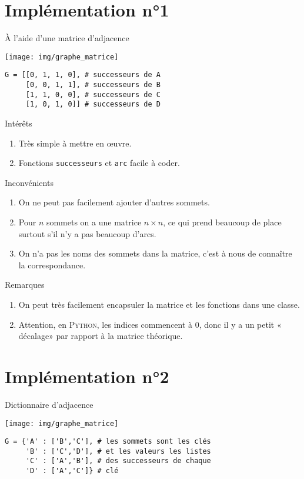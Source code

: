 \documentclass[10pt]{beamer}
\begin{document}
\section*{Implémentation n°1}
\begin{frame}[fragile]{À l'aide d'une matrice d'adjacence}
\begin{center}
\texttt{[image: img/graphe\_matrice]}
\end{center}
\begin{verbatim}
G = [[0, 1, 1, 0], # successeurs de A
     [0, 0, 1, 1], # successeurs de B
     [1, 1, 0, 0], # successeurs de C
     [1, 0, 1, 0]] # successeurs de D
\end{verbatim}
\end{frame}
\begin{frame}{Intérêts}
\begin{enumerate}[--]
	\item 	Très simple à mettre en \oe uvre.
	\item 	Fonctions \texttt{successeurs} et \texttt{arc} facile à coder.
\end{enumerate}
\end{frame}
\begin{frame}{Inconvénients}
\begin{enumerate}[--]
	\item 	On ne peut pas facilement ajouter d'autres sommets.
	\item 	Pour $n$ sommets on a une matrice $n\times n$, ce qui prend beaucoup de place surtout s'il n'y a pas beaucoup d'arcs.
    \item 	On n'a pas les noms des sommets dans la matrice, c'est à nous de connaître la correspondance.
\end{enumerate}
\end{frame}
\begin{frame}{Remarques}
\begin{enumerate}[--]
	\item 	On peut très facilement encapsuler la matrice et les fonctions dans une classe.
	\item 	Attention, en \textsc{Python}, les indices commencent à 0, donc il y a un petit « décalage» par rapport à la matrice théorique.	
\end{enumerate}

\end{frame}
\section*{Implémentation n°2}
\begin{frame}[fragile]{Dictionnaire d'adjacence}
\begin{center}
	\texttt{[image: img/graphe\_matrice]}
\end{center}
\begin{verbatim}
G = {'A' : ['B','C'], # les sommets sont les clés
     'B' : ['C','D'], # et les valeurs les listes 
     'C' : ['A','B'], # des successeurs de chaque
     'D' : ['A','C']} # clé
\end{verbatim}
\end{frame}
\end{document}
